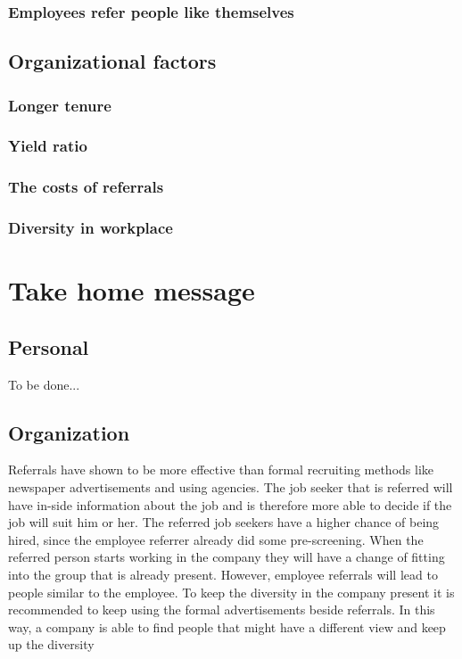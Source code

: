 \documentclass[a4paper, 11pt]{article} %
\begin{document}
\subsubsection*{Employees refer people like themselves}

\subsection*{Organizational factors}

\subsubsection*{Longer tenure}
\subsubsection*{Yield ratio}
\subsubsection*{The costs of referrals}
\subsubsection*{Diversity in workplace}

\section*{Take home message}

\subsection*{Personal}
To be done...

\subsection*{Organization}
Referrals have shown to be more effective than formal recruiting methods like newspaper advertisements and using agencies.
The job seeker that is referred will have in-side information about the job and is therefore more able to decide if the job will suit him or her.
The referred job seekers have a higher chance of being hired, since the employee referrer already did some pre-screening.
When the referred person starts working in the company they will have a change of fitting into the group that is already present. 
However, employee referrals will lead to people similar to the employee.
To keep the diversity in the company present it is recommended to keep using the formal advertisements beside referrals. 
In this way, a company is able to find people that might have a different view and keep up the diversity
\end{document}
